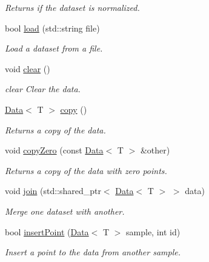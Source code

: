 \begin{DoxyCompactItemize}
\begin{DoxyCompactList}\small\item\em Returns if the dataset is normalized. \end{DoxyCompactList}\item 
bool \hyperlink{class_data_a1d15d02eb38c6fb9ebf5d29ecafe7eee}{load} (std\+::string file)
\begin{DoxyCompactList}\small\item\em Load a dataset from a file. \end{DoxyCompactList}\item 
\mbox{\label{class_data_a3fc15f7a8c270b72af86951d6955608d}} 
void \hyperlink{class_data_a3fc15f7a8c270b72af86951d6955608d}{clear} ()
\begin{DoxyCompactList}\small\item\em clear Clear the data. \end{DoxyCompactList}\item 
\hyperlink{class_data}{Data}$<$ T $>$ \hyperlink{class_data_ae1cc8dec46ae498a0d00f4e573edc795}{copy} ()
\begin{DoxyCompactList}\small\item\em Returns a copy of the data. \end{DoxyCompactList}\item 
void \hyperlink{class_data_ad94f8c8227a298b5cc0a862658f8cb99}{copy\+Zero} (const \hyperlink{class_data}{Data}$<$ T $>$ \&other)
\begin{DoxyCompactList}\small\item\em Returns a copy of the data with zero points. \end{DoxyCompactList}\item 
void \hyperlink{class_data_abf57674d356299c2be916331791e8f12}{join} (std\+::shared\+\_\+ptr$<$ \hyperlink{class_data}{Data}$<$ T $>$ $>$ data)
\begin{DoxyCompactList}\small\item\em Merge one dataset with another. \end{DoxyCompactList}\item 
bool \hyperlink{class_data_a2357782011d11c06500b1d752b9428c6}{insert\+Point} (\hyperlink{class_data}{Data}$<$ T $>$ sample, int id)
\begin{DoxyCompactList}\small\item\em Insert a point to the data from another sample. \end{DoxyCompactList}\item 

\end{DoxyCompactItemize}
